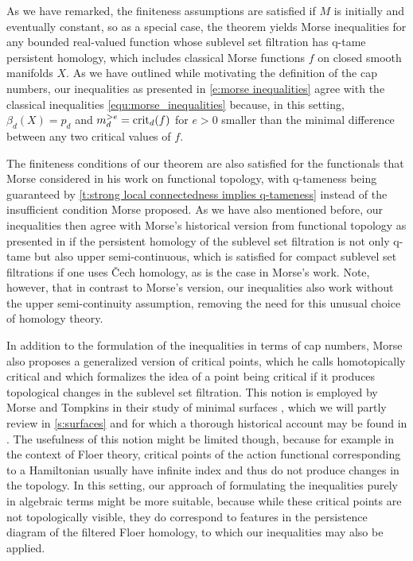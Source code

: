 As we have remarked, the finiteness assumptions are satisfied if $M$ is initially and eventually constant, so as a special case, the theorem yields Morse inequalities for any bounded real-valued function whose sublevel set filtration has q-tame persistent homology, which includes classical Morse functions $f$ on closed smooth manifolds $X$.
As we have outlined while motivating the definition of the cap numbers, our inequalities as presented in \eqref{e:morse inequalities} agree with the classical inequalities \eqref{equ:morse_inequalities} because, in this setting, $\beta_d(X) = p_d$ and $m_d^{>e} = \operatorname{crit}_d(f)$ for $e > 0$ smaller than the minimal difference between any two critical values of $f$.

The finiteness conditions of our theorem are also satisfied for the functionals that Morse considered in his work on functional topology, with q-tameness being guaranteed by \cref{t:strong local connectedness implies q-tameness} instead of the insufficient condition Morse proposed.
As we have also mentioned before, our inequalities then agree with Morse's historical version from functional topology as presented in \cite{Morse.1940} if the persistent homology of the sublevel set filtration is not only q-tame but also upper semi-continuous, which is satisfied for compact sublevel set filtrations if one uses \v{C}ech homology, as is the case in Morse's work.
Note, however, that in contrast to Morse's version, our inequalities also work without the upper semi-continuity assumption, removing the need for this unusual choice of homology theory.

\begin{rem}
	In addition to the formulation of the inequalities in terms of cap numbers, Morse also proposes a generalized version of critical points, which he calls homotopically critical and which formalizes the idea of a point being critical if it produces topological changes in the sublevel set filtration.
	This notion is employed by Morse and Tompkins in their study of minimal surfaces \cite{Morse.1939}, which we will partly review in \cref{s:surfaces} and for which a thorough historical account may be found in \cite[Section II.6]{Struwe.1988}.
	The usefulness of this notion might be limited though, because for example in the context of Floer theory, critical points of the action functional corresponding to a Hamiltonian usually have infinite index and thus do not produce changes in the topology.
	In this setting, our approach of formulating the inequalities purely in algebraic terms might be more suitable, because while these critical points are not topologically visible, they do correspond to features in the persistence diagram of the filtered Floer homology, to which our inequalities may also be applied.
\end{rem}
